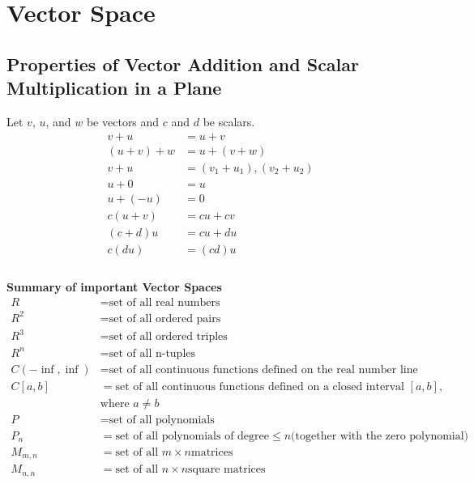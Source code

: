 \documentclass[]{article}
\begin{document}
\section{Vector Space}

\subsection{Properties of Vector Addition and Scalar Multiplication in a Plane}

Let $v$, $u$, and $w$  be vectors and $c$ and $d$ be scalars. \\
\begin{align}
	v + u &= u + v \\
	( u + v ) + w &= u + ( v + w ) \\
	v + u &= (v_1 + u_1),(v_2 + u_2) \\
	u + 0 &= u \\
	u + (-u) &= 0 \\
	c ( u + v ) &= cu + cv \\
	( c + d ) u &= cu + du \\
	c ( du ) &= ( cd ) u \\ 
\end{align} \\
\textbf{Summary of important Vector Spaces} \\
\begin{align*}
R &= \text{set of all real numbers}\\
R^2 &= \text{set of all ordered pairs}\\
R^3 &= \text{set of all ordered triples}\\
R^n &= \text{set of all n-tuples}\\
C ( − \inf , \inf ) &= 
		\text{set of all continuous functions defined on the real number line} \\
C [ a, b ] &= 
		\text{set of all continuous functions defined on a closed interval }[ a, b ] , \\
		& \text{where } a \neq b \\
P &= \text{set of all polynomials}\\
P_n &= \text{set of all polynomials of degree} ≤ n 
		\text{(together with the zero polynomial)} \\
M_{m,n} &= \text{set of all } m × n \text{matrices} \\
M_{n,n} &= \text{set of all } n × n \text{square matrices} \\
\end{align*} \\
\end{document}
